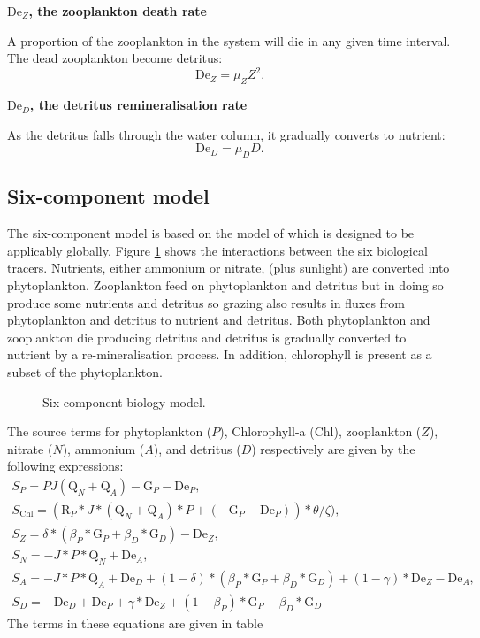 \textbf{$\mathrm{De}_Z$, the zooplankton death rate}\label{sec:De_Z}

A proportion of the zooplankton in the system will die in any given time
interval. The dead zooplankton become detritus:
\begin{equation}
  \mathrm{De}_Z=\mu_Z Z^2.
\end{equation}

\textbf{$\mathrm{De}_D$, the detritus remineralisation rate}\label{sec:De_D}

As the detritus falls through the water column, it gradually converts to
nutrient:
\begin{equation}
  \mathrm{De}_D=\mu_D D.
\end{equation}

\subsection{Six-component model}
\label{sec:bio-6-component}

The six-component model is based on the model of \citet{popova2006}
which is designed to be applicably globally. 
Figure \ref{fig:biofluxes6} shows the interactions between the six
biological tracers. Nutrients, either ammonium or nitrate, (plus sunlight) are converted into
phytoplankton. Zooplankton feed on phytoplankton and detritus but in doing
so produce some nutrients and detritus so grazing also results in fluxes
from phytoplankton and detritus to nutrient and detritus. Both phytoplankton
and zooplankton die producing detritus and detritus is gradually converted to
nutrient by a re-mineralisation process. In addition, chlorophyll is present
as a subset of the phytoplankton.

\begin{figure}[ht]
  \centering
  \caption{Six-component biology model.}
  \label{fig:biofluxes6}
\end{figure}


The source terms for phytoplankton ($P$), Chlorophyll-a ($\mathrm{Chl}$), zooplankton ($Z$), nitrate ($N$),
ammonium ($A$), and detritus ($D$) respectively are given by the following expressions:
\begin{gather}\label{eq:bio6_sources}
  S_P=PJ(\mathrm{Q}_N+\mathrm{Q}_A) - \mathrm{G}_P - \mathrm{De}_P,\\
  S_{\mathrm{Chl}}=(\mathrm{R}_P*J*(\mathrm{Q}_N+\mathrm{Q}_A)*P + 
      (-\mathrm{G}_P-\mathrm{De}_P))*\theta/\zeta),\\
  S_Z=\delta*(\beta_P*\mathrm{G}_P+\beta_D*\mathrm{G}_D) - \mathrm{De}_Z,\\
  S_N=-J*P*\mathrm{Q}_N+\mathrm{De}_A,\\
  S_A=-J*P*\mathrm{Q}_A + \mathrm{De}_D + (1 - \delta)*(\beta_P*\mathrm{G}_P + \beta_D*\mathrm{G}_D) + (1-\gamma)*\mathrm{De}_Z-\mathrm{De}_A,\\
  S_D=-\mathrm{De}_D + \mathrm{De}_P + \gamma*\mathrm{De}_Z +(1-\beta_P)*\mathrm{G}_P - \beta_D*\mathrm{G}_D
\end{gather}
The terms in these equations are given in table 

